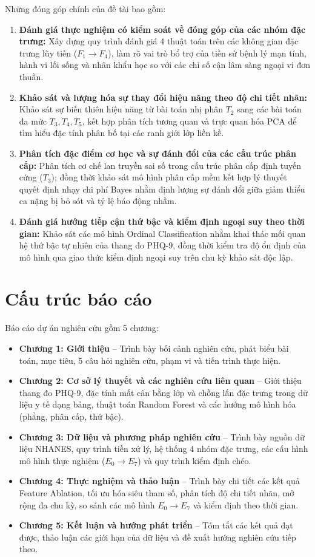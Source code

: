 Những đóng góp chính của đề tài bao gồm:
\begin{enumerate}
    \item \textbf{Đánh giá thực nghiệm có kiểm soát về đóng góp của các nhóm đặc trưng:} Xây dựng quy trình đánh giá 4 thuật toán trên các không gian đặc trưng lũy tiến ($F_1 \to F_4$), làm rõ vai trò bổ trợ của tiền sử bệnh lý mạn tính, hành vi lối sống và nhân khẩu học so với các chỉ số cận lâm sàng ngoại vi đơn thuần.
    \item \textbf{Khảo sát và lượng hóa sự thay đổi hiệu năng theo độ chi tiết nhãn:} Khảo sát sự biến thiên hiệu năng từ bài toán nhị phân $T_2$ sang các bài toán đa mức $T_3, T_4, T_5$, kết hợp phân tích tương quan và trực quan hóa PCA để tìm hiểu đặc tính phân bố tại các ranh giới lớp liền kề.
    \item \textbf{Phân tích đặc điểm cơ học và sự đánh đổi của các cấu trúc phân cấp:} Phân tích cơ chế lan truyền sai số trong cấu trúc phân cấp định tuyến cứng ($T_3$); đồng thời khảo sát mô hình phân cấp mềm kết hợp lý thuyết quyết định nhạy chi phí Bayes nhằm định lượng sự đánh đổi giữa giảm thiểu ca nặng bị bỏ sót và tỷ lệ báo động nhầm.
    \item \textbf{Đánh giá hướng tiếp cận thứ bậc và kiểm định ngoại suy theo thời gian:} Khảo sát các mô hình Ordinal Classification nhằm khai thác mối quan hệ thứ bậc tự nhiên của thang đo PHQ-9, đồng thời kiểm tra độ ổn định của mô hình qua giao thức kiểm định ngoại suy trên chu kỳ khảo sát độc lập.
\end{enumerate}

\section{Cấu trúc báo cáo}
\label{sec:bo-cuc-khoa-luan}

Báo cáo dự án nghiên cứu gồm 5 chương:
\begin{itemize}
    \item \textbf{Chương 1: Giới thiệu} -- Trình bày bối cảnh nghiên cứu, phát biểu bài toán, mục tiêu, 5 câu hỏi nghiên cứu, phạm vi và tiến trình thực hiện.
    \item \textbf{Chương 2: Cơ sở lý thuyết và các nghiên cứu liên quan} -- Giới thiệu thang đo PHQ-9, đặc tính mất cân bằng lớp và chồng lấn đặc trưng trong dữ liệu y tế dạng bảng, thuật toán Random Forest và các hướng mô hình hóa (phẳng, phân cấp, thứ bậc).
    \item \textbf{Chương 3: Dữ liệu và phương pháp nghiên cứu} -- Trình bày nguồn dữ liệu NHANES, quy trình tiền xử lý, hệ thống 4 nhóm đặc trưng, các cấu hình mô hình thực nghiệm ($E_0 \to E_7$) và quy trình kiểm định chéo.
    \item \textbf{Chương 4: Thực nghiệm và thảo luận} -- Trình bày chi tiết các kết quả Feature Ablation, tối ưu hóa siêu tham số, phân tích độ chi tiết nhãn, mở rộng đa chu kỳ, so sánh các mô hình $E_0 \to E_7$ và kiểm định theo thời gian.
    \item \textbf{Chương 5: Kết luận và hướng phát triển} -- Tóm tắt các kết quả đạt được, thảo luận các giới hạn của dữ liệu và đề xuất hướng nghiên cứu tiếp theo.
\end{itemize}
